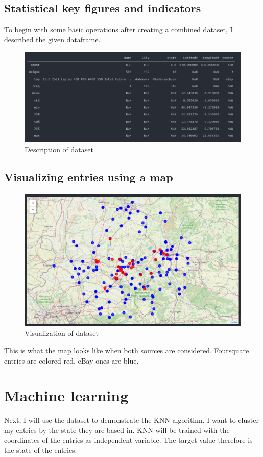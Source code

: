 \subsection{Statistical key figures and indicators}
To begin with some basic operations after creating a combined dataset, I described the given dataframe.
\begin{figure}[H]
	\includegraphics[width=\textwidth]{Bilder/general_findings.PNG}
	\caption{Description of dataset}
\end{figure}
\subsection{Visualizing entries using a map}
\begin{figure}[H]
	\includegraphics[width=\textwidth]{Bilder/combined_map.PNG}
	\caption{Visualization of dataset}
\end{figure}
This is what the map looks like when both sources are considered. Foursquare entries are colored red, eBay ones are blue.
\section{Machine learning}
Next, I will use the dataset to demonstrate the KNN algorithm. I want to cluster my entries by the state they are based in. KNN will be trained with the coordinates of the entries as independent variable. The target value therefore is the state of the entries.
